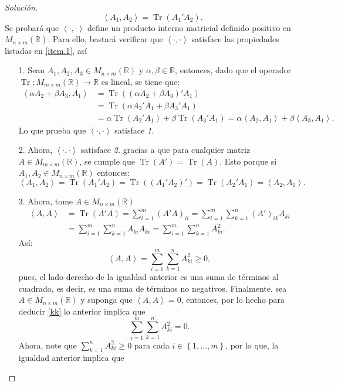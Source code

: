 \documentclass[10.5pt,notitlepage]{article}
\newenvironment{solucion}
  {\begin{proof}[Solución]}
  {\end{proof}}
\DeclareMathOperator{\Tr}{Tr}
\newcommand{\RR}{\mathbb{R}}
\newcommand{\inner}[1]{\left\langle #1 \right\rangle}
\newcommand{\kis}[1]{\left\{ #1 \right\}}
\theoremstyle{plain}
\begin{document}
\begin{solucion}
\[
\inner{A_1,A_2} = \Tr(A_1'A_2).
\]
Se probará que \(\inner{\cdot, \cdot}\) define un producto interno matricial definido positivo en \(M_{n \times m}(\RR)\). Para ello, bastará verificar que \(\inner{\cdot, \cdot}\) satisface las propiedades listadas en \ref{item.1}, así
\begin{itemize}
    \item[1.] Sean \(A_1,A_2,A_3\in M_{n\times m}(\RR)\) y \(\alpha, \beta \in \RR\), entonces, dado que el operador \(\Tr: M_{m\times m }(\RR) \to \RR\) es lineal, se tiene que: 
    \begin{align*}
     \inner{\alpha A_2+ \beta A_3, A_1} &= \Tr((\alpha A_2+ \beta A_3)' A_1) \\ 
                                   &=\Tr(\alpha A_2'A_1+ \beta A_3'A_1)\\
                                   &= \alpha\Tr(A_2'A_1)+ \beta\Tr(A_3'A_1) = \alpha \inner{A_2,A_1} + \beta \inner{A_3, A_1}. 
    \end{align*}
    Lo que prueba que \(\inner{\cdot, \cdot}\) satisface \textit{1.}
    \item[2.] Ahora, \(\inner{\cdot,\cdot}\) satisface \textit{2.} gracias a que para cualquier matriz \(A \in M_{m \times m}(\RR)\), se cumple que \(\Tr(A') = \Tr(A)\). Esto porque si \(A_1, A_2 \in M_{n \times m}(\RR)\) entonces: 
    \[
    \inner{A_1,A_2}= \Tr(A_1' A_2) = \Tr((A_1'A_2)') = \Tr(A_2' A_1) =  \inner{A_2,A_1}.
    \]
    \item[3.] Ahora, tome \(A \in M_{n \times m}(\RR)\) 
   \begin{align*}
      \inner{A,A} &= \Tr(A'A) = \sum_{i= 1}^{m}(A'A)_{ii} = \sum_{i= 1}^{m} \sum_{k = 1}^{n}(A')_{ik}A_{ki} \\ 
                  &= \sum_{i= 1}^{m} \sum_{k = 1}^{n}A_{ki}A_{ki}= \sum_{i= 1}^{m} \sum_{k = 1}^{n}A_{ki}^2. 
    \end{align*}
    Así: 
    \begin{equation}\label{kk}
       \inner{A,A} = \sum_{i= 1}^{m} \sum_{k = 1}^{n}A_{ki}^2 \geq 0, 
    \end{equation}
    pues, el lado derecho de la igualdad anterior es una suma de términos al cuadrado, es decir, es una suma de términos no negativos. Finalmente, sea \(A \in M_{n \times m}(\RR)\) y suponga que \(\inner{A,A} = 0\), entonces, por lo hecho para deducir \eqref{kk} lo anterior implica que
    \[
     \sum_{i = 1}^{m} \sum_{k = 1}^{n}A_{ki}^2 = 0. 
    \] 
    Ahora, note que \(\sum_{k = 1}^{n}A_{ki}^2 \geq 0\) para cada \(i \in \kis{1, \hdots, m}\), por lo que, la igualdad anterior implica que 

\end{itemize}
\end{solucion}
\end{document}
